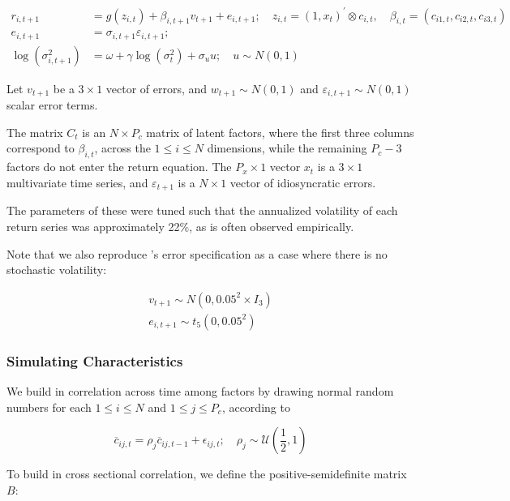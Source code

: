 \documentclass{article}
\begin{document}
\begin{align}
r_{i, t+1} &= 
g\left(z_{i, t}\right) + \beta_{i,t+1}v_{t+1} + e_{i, t+1}; 
\quad z_{i, t}=\left(1, x_{t}\right)^{\prime} \otimes c_{i, t}, 
\quad \beta_{i, t}=\left(c_{i 1, t}, c_{i 2, t}, c_{i 3, t}\right) \\ 
e_{i, t+1} &= 
\sigma_{i, t+1} \varepsilon_{i, t+1}; \\
\operatorname{log} (\sigma^2_{i,t+1}) &= 
\omega + \gamma \operatorname{log} (\sigma^2_{t}) + \sigma_{u}u; 
\quad u \sim N(0, 1)
\end{align}

Let $v_{t+1}$ be a $3\times 1$ vector of errors, and $w_{t+1} \sim N(0, 1)$ and $\varepsilon_{i,t+1} \sim N(0, 1)$ scalar error terms. 

The matrix $C_t$ is an $N\times P_c$ matrix of latent factors, where the first three columns correspond to $\beta_{i,t}$, across the $1\leq i\leq N$ dimensions, while the remaining $P_c-3$ factors do not enter the return equation. The $P_x\times1$ vector $x_t$ is a $3 \times 1$ multivariate time series, and $\varepsilon_{t+1}$ is a $N\times 1$ vector of idiosyncratic errors. 

The parameters of these were tuned such that the annualized volatility of each return series was approximately 22\%, as is often observed empirically.

Note that we also reproduce \cite{gu_empirical_2018}'s error specification as a case where there is no stochastic volatility:

\begin{align}
v_{t+1} \sim N(0, 0.05^2 \times I_3) \\
e_{i, t+1} \sim t_5(0, 0.05^2)
\end{align}

\subsubsection{Simulating Characteristics}
We build in correlation across time among factors by drawing normal random numbers for each $1\leq i\leq N$ and $1\leq j\leq P_{c}$, according to 

\begin{equation}
\overline{c}_{i j, t} = \rho_{j} \overline{c}_{i j, t-1}+\epsilon_{i j, t} ;
\quad \rho_{j} \sim \mathcal{U} \left( \frac{1}{2},1 \right) 
\end{equation}

To build in cross sectional correlation, we define the positive-semidefinite matrix $B$:
\end{document}
